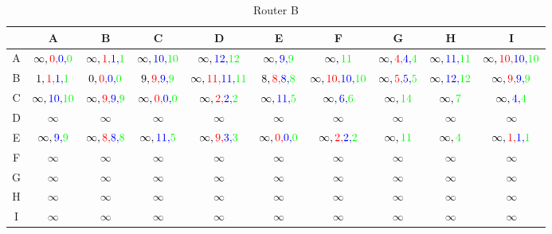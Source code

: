 \documentclass[a4paper,10pt]{article}
\begin{document}
\begin{table}[H]
\centering
\begin{tabular}{|c|c|c|c|c|c|c|c|c|c|} \hline
 & A & B & C & D & E & F & G & H & I  \\\hline
A & $ \infty,{\color{red}0,}{\color{blue}0,}{\color{green}0} $ & $\infty,{\color{red}1,}{\color{blue}1,}{\color{green}1} $ & $\infty,{\color{blue}10,}{\color{green}10} $ & $\infty,{\color{blue}12,}{\color{green}12} $ & $\infty,{\color{blue}9,}{\color{green}9} $ & $\infty,{\color{green}11} $ & $\infty,{\color{red}4,}{\color{blue}4,}{\color{green}4} $ & $\infty,{\color{blue}11,}{\color{green}11} $ & $\infty,{\color{red}10,}{\color{blue}10,}{\color{green}10} $ \\\hline
B & $1,{\color{red}1,}{\color{blue}1,}{\color{green}1} $ & $0,{\color{red}0,}{\color{blue}0,}{\color{green}0} $ & $9,{\color{red}9,}{\color{blue}9,}{\color{green}9} $ & $\infty,{\color{red}11,}{\color{blue}11,}{\color{green}11}$ & $8,{\color{red}8,}{\color{blue}8,}{\color{green}8} $ & $\infty,{\color{red}10,}{\color{blue}10,}{\color{green}10} $ & $\infty,{\color{red}5,}{\color{blue}5,}{\color{green}5} $ & $\infty,{\color{blue}12,}{\color{green}12} $ & $\infty,{\color{red}9,}{\color{blue}9,}{\color{green}9} $ \\\hline
C & $\infty,{\color{blue}10,}{\color{green}10} $ & $\infty,{\color{red}9,}{\color{blue}9,}{\color{green}9} $ & $\infty,{\color{red}0,}{\color{blue}0,}{\color{green}0} $ & $\infty,{\color{red}2,}{\color{blue}2,}{\color{green}2} $ & $\infty,{\color{blue}11,}{\color{green}5} $ & $\infty,{\color{blue}6,}{\color{green}6} $ & $\infty,{\color{green}14} $ & $\infty,{\color{green}7} $ & $\infty,{\color{blue}4,}{\color{green}4} $ \\\hline
D & $\infty $ & $\infty $ & $\infty $ & $\infty $ & $\infty $ & $\infty $ & $\infty $ & $\infty $ & $\infty $ \\\hline
E & $\infty,{\color{blue}9,}{\color{green}9} $ & $\infty,{\color{red}8,}{\color{blue}8,}{\color{green}8} $ & $\infty,{\color{blue}11,}{\color{green}5} $ & $\infty,{\color{red}9,}{\color{blue}3,}{\color{green}3} $ & $\infty,{\color{red}0,}{\color{blue}0,}{\color{green}0} $ & $\infty,{\color{red}2,}{\color{blue}2,}{\color{green}2} $ & $\infty,{\color{green}11} $ & $\infty,{\color{green}4} $ & $\infty,{\color{red}1,}{\color{blue}1,}{\color{green}1} $ \\\hline
F & $\infty $ & $\infty $ & $\infty $ & $\infty $ & $\infty $ & $\infty $ & $\infty $ & $\infty $ & $\infty $ \\\hline
G & $\infty $ & $\infty $ & $\infty $ & $\infty $ & $\infty $ & $\infty $ & $\infty $ & $\infty $ & $\infty $ \\\hline
H & $\infty $ & $\infty $ & $\infty $ & $\infty $ & $\infty $ & $\infty $ & $\infty $ & $\infty $ & $\infty $ \\\hline
I & $\infty $ & $\infty $ & $\infty $ & $\infty $ & $\infty $ & $\infty $ & $\infty $ & $\infty $ & $\infty $ \\\hline
\end{tabular}
\caption{Router B}
\end{table} \\
\end{document}
